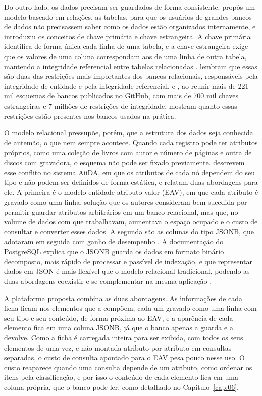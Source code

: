 Do outro lado, os dados precisam ser guardados de forma consistente.  propôs um modelo baseado em relações, as tabelas, para que
os usuários de grandes bancos de dados não precisassem saber como os dados estão organizados internamente, e introduziu os conceitos de chave primária e chave
estrangeira. A chave primária identifica de forma única cada linha de uma tabela, e a chave estrangeira exige que os valores de uma
coluna correspondam aos de uma linha de outra tabela, mantendo a integridade referencial entre tabelas relacionadas \cite{PostgreSQL2025}.
 lembram que essas são duas das restrições mais importantes dos bancos relacionais, responsáveis pela integridade de entidade e pela
integridade referencial, e , ao reunir mais de 221 mil esquemas de bancos publicados no GitHub, com mais de 700 mil
chaves estrangeiras e 7 milhões de restrições de integridade, mostram quanto essas restrições estão presentes nos bancos usados na prática.

O modelo relacional pressupõe, porém, que a estrutura dos dados seja conhecida de antemão, o que nem sempre acontece. Quando cada registro pode ter atributos
próprios, como uma coleção de livros com autor e número de páginas e outra de discos com gravadora, o esquema não pode ser fixado previamente.
 descrevem esse conflito no sistema AiiDA, em que os atributos de cada nó dependem do seu tipo e não podem ser definidos de forma
estática, e relatam duas abordagens para ele. A primeira é o modelo entidade-atributo-valor (EAV), em que cada atributo é gravado como uma linha, solução que
os autores consideram bem-sucedida por permitir guardar atributos arbitrários em um banco relacional, mas que, no volume de dados com que trabalhavam,
aumentava o espaço ocupado e o custo de consultar e converter esses dados. A segunda são as colunas do tipo JSONB, que adotaram em seguida com ganho de
desempenho \cite{Huber2020}. A documentação do PostgreSQL explica que o JSONB guarda os dados em formato binário decomposto, mais rápido de processar e passível
de indexação, e que representar dados em JSON é mais flexível que o modelo relacional tradicional, podendo as duas abordagens coexistir e se complementar na
mesma aplicação \cite{PostgreSQL2025json}.

A plataforma proposta combina as duas abordagens. As informações de cada ficha ficam nos elementos que a compõem, cada um gravado como uma linha com seu tipo e
seu conteúdo, de forma próxima ao EAV, e a aparência de cada elemento fica em uma coluna JSONB, já que o banco apenas a guarda e a devolve. Como a ficha é
carregada inteira para ser exibida, com todos os seus elementos de uma vez, e não montada atributo por atributo em consultas separadas, o custo de consulta
apontado para o EAV pesa pouco nesse uso. O custo reaparece quando uma consulta depende de um atributo, como ordenar os itens pela classificação, e por isso
o conteúdo de cada elemento fica em uma coluna própria, que o banco pode ler, como detalhado no Capítulo~\ref{cap:06}.

